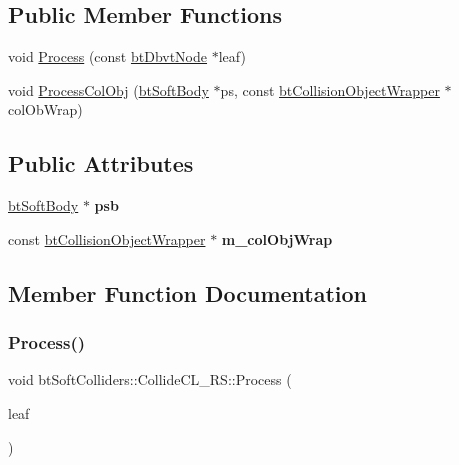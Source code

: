 \subsection*{Public Member Functions}
\begin{DoxyCompactItemize}
\item 
void \hyperlink{structbtSoftColliders_1_1CollideCL__RS_a020b9712f8e0c9c2dd901c93a1f97120}{Process} (const \hyperlink{structbtDbvtNode}{bt\+Dbvt\+Node} $\ast$leaf)
\item 
void \hyperlink{structbtSoftColliders_1_1CollideCL__RS_a34f463ddcfcda480e9843277d4bd732e}{Process\+Col\+Obj} (\hyperlink{classbtSoftBody}{bt\+Soft\+Body} $\ast$ps, const \hyperlink{structbtCollisionObjectWrapper}{bt\+Collision\+Object\+Wrapper} $\ast$col\+Ob\+Wrap)
\end{DoxyCompactItemize}
\subsection*{Public Attributes}
\begin{DoxyCompactItemize}
\item 
\mbox{\label{structbtSoftColliders_1_1CollideCL__RS_a0662ec8322a255b1dbc22b8ae512cd9c}} 
\hyperlink{classbtSoftBody}{bt\+Soft\+Body} $\ast$ {\bfseries psb}
\item 
\mbox{\label{structbtSoftColliders_1_1CollideCL__RS_a8e9189fbd214b4f700536892d098d0f4}} 
const \hyperlink{structbtCollisionObjectWrapper}{bt\+Collision\+Object\+Wrapper} $\ast$ {\bfseries m\+\_\+col\+Obj\+Wrap}
\end{DoxyCompactItemize}


\subsection{Member Function Documentation}
\mbox{\label{structbtSoftColliders_1_1CollideCL__RS_a020b9712f8e0c9c2dd901c93a1f97120}} 
\subsubsection{\texorpdfstring{Process()}{Process()}}
{\footnotesize\ttfamily void bt\+Soft\+Colliders\+::\+Collide\+C\+L\+\_\+\+R\+S\+::\+Process (\begin{DoxyParamCaption}\item[{const \hyperlink{structbtDbvtNode}{bt\+Dbvt\+Node} $\ast$}]{leaf }\end{DoxyParamCaption})\hspace{0.3cm}{\ttfamily [inline]}}

